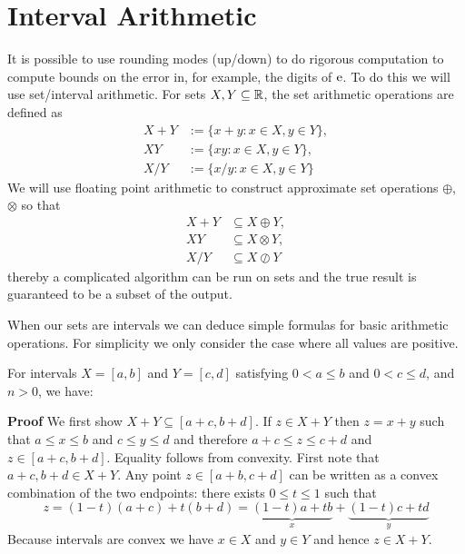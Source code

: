 
\section{Interval Arithmetic}
It is possible to use rounding modes (up/down)  to do rigorous computation to compute bounds on the error in, for example, the digits of ${\rm e}$. To do this we will use set/interval arithmetic. For sets $X,Y \subseteq {\mathbb R}$, the set arithmetic operations are defined as
\begin{align*}
X + Y &:= \{x + y : x \ensuremath{\in} X, y \ensuremath{\in} Y\}, \\
XY &:= \{xy : x \ensuremath{\in} X, y \ensuremath{\in} Y\}, \\
X/Y &:= \{x/y : x \ensuremath{\in} X, y \ensuremath{\in} Y\}
\end{align*}
We will use floating point arithmetic to construct approximate set operations $\ensuremath{\oplus}$, $\ensuremath{\otimes}$ so that
\begin{align*}
  X + Y &\ensuremath{\subseteq} X \ensuremath{\oplus} Y, \\
   XY &\ensuremath{\subseteq} X \ensuremath{\otimes} Y,\\
    X/Y &\ensuremath{\subseteq} X \ensuremath{\oslash} Y
    \end{align*}
thereby a complicated algorithm can be run on sets and the true result is guaranteed to be a subset of the output.

When our sets are intervals we can deduce simple formulas for basic arithmetic operations. For simplicity we only consider the case where all values are positive.

\begin{proposition} For intervals  $X = [a,b]$ and $Y = [c,d]$ satisfying $0 < a \ensuremath{\leq} b$ and $0 < c \ensuremath{\leq} d$, and $n > 0$, we have:
\end{proposition}
\textbf{Proof} We first show $X+Y \ensuremath{\subseteq} [a+c,b+d]$. If $z \ensuremath{\in} X + Y$ then $z = x+y$ such that $a \ensuremath{\leq} x \ensuremath{\leq} b$ and $c \ensuremath{\leq} y \ensuremath{\leq} d$ and therefore $a + c \ensuremath{\leq} z \ensuremath{\leq} c + d$ and $z \ensuremath{\in} [a+c,b+d]$. Equality follows from convexity. First note that $a+c, b+d \ensuremath{\in} X+Y$. Any point $z \ensuremath{\in}  [a+b,c+d]$ can be written  as a convex combination of the two endpoints: there exists $0 \ensuremath{\leq} t \ensuremath{\leq} 1$ such that
\[
z = (1-t) (a+c) + t (b+d) =  \underbrace{(1-t) a + t b}_x + \underbrace{(1-t) c + t d}_y
\]
Because intervals are convex we have $x \ensuremath{\in} X$ and $y \ensuremath{\in} Y$ and hence $z \ensuremath{\in} X+Y$. 

